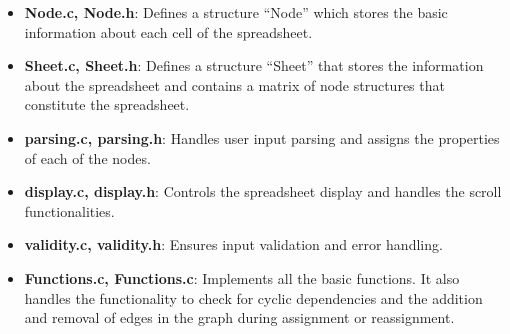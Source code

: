 \documentclass[a4paper,12pt,oneside]{article}
\begin{document}
\begin{itemize}
    
    \item \textbf{Node.c, Node.h}: Defines a structure ``Node''
 which stores the basic information about each cell of the spreadsheet.
    \item \textbf{Sheet.c, Sheet.h}: Defines a structure ``Sheet'' that stores the information about the spreadsheet and contains a matrix of node structures that constitute the spreadsheet.
    \item \textbf{parsing.c, parsing.h}: Handles user input parsing and assigns the properties of each of the nodes.
    \item \textbf{display.c, display.h}: Controls the spreadsheet display and handles the scroll functionalities.
    \item \textbf{validity.c, validity.h}: Ensures input validation and error handling.
    \item \textbf{Functions.c, Functions.c}: Implements all the basic functions. It also handles the functionality to check for cyclic dependencies and the addition and removal of edges in the graph during assignment or reassignment.
\end{itemize}




\end{document}
